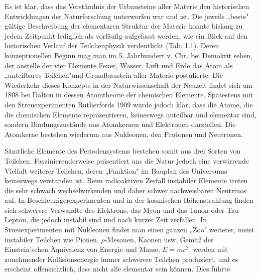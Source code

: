 \documentclass[10pt, letterpaper]{article}
\begin{document}
Es ist klar, dass das Verständnis der Urbausteine aller Materie den historischen Entwicklungen der Naturforschung unterworfen war und ist. Die jeweils „beste" gültige Beschreibung der elementaren Struktur der Materie konnte bislang zu jedem Zeitpunkt lediglich als vorläufig aufgefasst werden, wie ein Blick auf den historischen Verlauf der Teilchenphysik verdeutlicht (Tab. 1.1). Deren konzeptionellen Beginn mag man im 5. Jahrhundert v. Chr. bei Demokrit sehen, der anstelle der vier Elemente Feuer, Wasser, Luft und Erde das Atom als „unteilbares Teilchen"und Grundbaustein aller Materie postulierte. Die Wiederkehr dieses Konzepts in der Naturwissenschaft der Neuzeit findet sich um 1808 bei Dalton in dessen Atomtheorie der chemischen Elemente. Spätestens mit den Streuexperimenten Rutherfords 1909 wurde jedoch klar, dass die Atome, die die chemischen Elemente repräsentieren, keineswegs unteilbar und elementar sind, sondern Bindungszustände aus Atomkernen und Elektronen darstellen. Die Atomkerne bestehen wiederum aus Nukleonen, den Protonen und Neutronen.

Sämtliche Elemente des Periodensystems bestehen somit aus drei Sorten von Teilchen. Faszinierenderweise präsentiert uns die Natur jedoch eine verwirrende Vielfalt weiterer Teilchen, deren „Funktion" im Bauplan des Universums keineswegs verstanden ist. Beim radioaktiven Zerfall instabiler Elemente treten die sehr schwach wechselwirkenden und daher schwer nachweisbaren Neutrinos auf. In Beschleunigerexperimenten und in der kosmischen Höhenstrahlung finden sich schwerere Verwandte des Elektrons, das Myon und das Tauon oder Tau-Lepton, die jedoch instabil sind und nach kurzer Zeit zerfallen. In Streuexperimenten mit Nukleonen findet man einen ganzen „Zoo" weiterer, meist instabiler Teilchen wie Pionen, $\rho$-Mesonen, Kaonen usw. Gemäß der Einstein'schen Äquivalenz von Energie und Masse, $E=m c^{2}$, werden mit zunehmender Kollisionsenergie immer schwerere Teilchen produziert, und es erscheint offensichtlich, dass nicht alle elementar sein können. Dies führte
\end{document}
